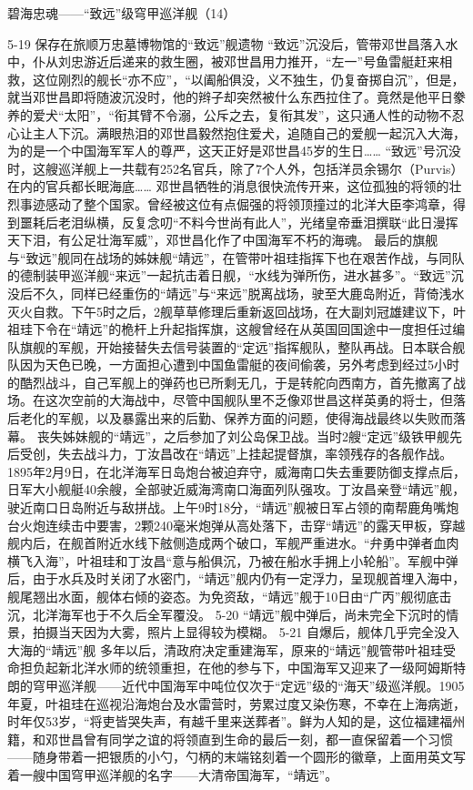 \documentclass[12pt,UTF8]{ctexbook}
\begin{document}
碧海忠魂——“致远”级穹甲巡洋舰（14）

5-19 保存在旅顺万忠墓博物馆的“致远”舰遗物
“致远”沉没后，管带邓世昌落入水中，仆从刘忠游近后递来的救生圈，被邓世昌用力推开，“左一”号鱼雷艇赶来相救，这位刚烈的舰长“亦不应”，“以阖船俱没，义不独生，仍复奋掷自沉”，但是，就当邓世昌即将随波沉没时，他的辫子却突然被什么东西拉住了。竟然是他平日豢养的爱犬“太阳”，“衔其臂不令溺，公斥之去，复衔其发”，这只通人性的动物不忍心让主人下沉。满眼热泪的邓世昌毅然抱住爱犬，追随自己的爱舰一起沉入大海，为的是一个中国海军军人的尊严，这天正好是邓世昌45岁的生日…… “致远”号沉没时，这艘巡洋舰上一共载有252名官兵，除了7个人外，包括洋员余锡尔（Purvis）在内的官兵都长眠海底……
邓世昌牺牲的消息很快流传开来，这位孤独的将领的壮烈事迹感动了整个国家。曾经被这位有点倔强的将领顶撞过的北洋大臣李鸿章，得到噩耗后老泪纵横，反复念叨“不料今世尚有此人”，光绪皇帝垂泪撰联“此日漫挥天下泪，有公足壮海军威”，邓世昌化作了中国海军不朽的海魂。
最后的旗舰
与“致远”舰同在战场的姊妹舰“靖远”，在管带叶祖珪指挥下也在艰苦作战，与同队的德制装甲巡洋舰“来远”一起抗击着日舰，“水线为弹所伤，进水甚多”。“致远”沉没后不久，同样已经重伤的“靖远”与“来远”脱离战场，驶至大鹿岛附近，背倚浅水灭火自救。下午5时之后，2舰草草修理后重新返回战场，在大副刘冠雄建议下，叶祖珪下令在“靖远”的桅杆上升起指挥旗，这艘曾经在从英国回国途中一度担任过编队旗舰的军舰，开始接替失去信号装置的“定远”指挥舰队，整队再战。日本联合舰队因为天色已晚，一方面担心遭到中国鱼雷艇的夜间偷袭，另外考虑到经过5小时的酷烈战斗，自己军舰上的弹药也已所剩无几，于是转舵向西南方，首先撤离了战场。在这次空前的大海战中，尽管中国舰队里不乏像邓世昌这样英勇的将士，但落后老化的军舰，以及暴露出来的后勤、保养方面的问题，使得海战最终以失败而落幕。
丧失姊妹舰的“靖远”，之后参加了刘公岛保卫战。当时2艘“定远”级铁甲舰先后受创，失去战斗力，丁汝昌改在“靖远”上挂起提督旗，率领残存的各舰作战。1895年2月9日，在北洋海军日岛炮台被迫弃守，威海南口失去重要防御支撑点后，日军大小舰艇40余艘，全部驶近威海湾南口海面列队强攻。丁汝昌亲登“靖远”舰，驶近南口日岛附近与敌拼战。上午9时18分，“靖远”舰被日军占领的南帮鹿角嘴炮台火炮连续击中要害，2颗240毫米炮弹从高处落下，击穿“靖远”的露天甲板，穿越舰内后，在舰首附近水线下舷侧造成两个破口，军舰严重进水。“弁勇中弹者血肉横飞入海”，叶祖珪和丁汝昌“意与船俱沉，乃被在船水手拥上小轮船”。军舰中弹后，由于水兵及时关闭了水密门，“靖远”舰内仍有一定浮力，呈现舰首埋入海中，舰尾翘出水面，舰体右倾的姿态。为免资敌，“靖远”舰于10日由“广丙”舰彻底击沉，北洋海军也于不久后全军覆没。
5-20
“靖远”舰中弹后，尚未完全下沉时的情景，拍摄当天因为大雾，照片上显得较为模糊。
5-21
自爆后，舰体几乎完全没入大海的“靖远”舰
多年以后，清政府决定重建海军，原来的“靖远”舰管带叶祖珪受命担负起新北洋水师的统领重担，在他的参与下，中国海军又迎来了一级阿姆斯特朗的穹甲巡洋舰——近代中国海军中吨位仅次于“定远”级的“海天”级巡洋舰。1905年夏，叶祖珪在巡视沿海炮台及水雷营时，劳累过度又染伤寒，不幸在上海病逝，时年仅53岁，“将吏皆哭失声，有越千里来送葬者”。鲜为人知的是，这位福建福州籍，和邓世昌曾有同学之谊的将领直到生命的最后一刻，都一直保留着一个习惯——随身带着一把银质的小勺，勺柄的末端铭刻着一个圆形的徽章，上面用英文写着一艘中国穹甲巡洋舰的名字——大清帝国海军，“靖远”。
\end{document}
